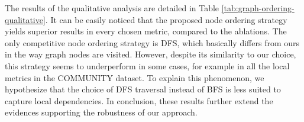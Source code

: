 The results of the qualitative analysis are detailed in Table \ref{tab:graph-ordering-qualitative}. It can be easily noticed that the proposed node ordering strategy yields superior results in every chosen metric, compared to the ablations. The only competitive node ordering strategy is DFS, which basically differs from ours in the way graph nodes are visited. However, despite its similarity to our choice, this strategy seems to underperform in some cases, for example in all the local metrics in the COMMUNITY dataset. To explain this phenomenon, we hypothesize that the choice of DFS traversal instead of BFS is less suited to capture local dependencies. In conclusion, these results further extend the evidences supporting the robustness of our approach.

